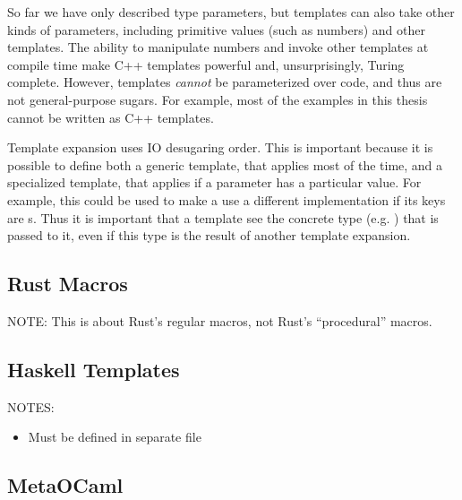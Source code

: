 So far we have only described type parameters, but templates can also
take other kinds of parameters, including primitive values (such as
numbers) and other templates. The ability to manipulate numbers and
invoke other templates at compile time make C++ templates powerful
and, unsurprisingly, Turing complete. However, templates \emph{cannot}
be parameterized over code, and thus are not general-purpose sugars.
For example, most of the examples in this thesis cannot be written as
C++ templates.

Template expansion uses IO desugaring order. This is important because
it is possible
to define both a generic template, that applies most of the time, and
a specialized template, that applies if a parameter has a particular
value. For example, this could be used to make a  use a different
implementation if its keys are s. Thus it is important that
a template see the concrete type (e.g. ) that is passed to
it, even if this type is the result of another template expansion.


\subsection{Rust Macros} \label{sec:taxonomy-rust}

NOTE: This is about Rust's regular macros, not Rust's ``procedural'' macros.


\subsection{Haskell Templates} \label{sec:taxonomy-haskell}

NOTES:
\begin{itemize}
  \item Must be defined in separate file
\end{itemize}


\subsection{MetaOCaml} \label{sec:taxonomy-metaocaml}

